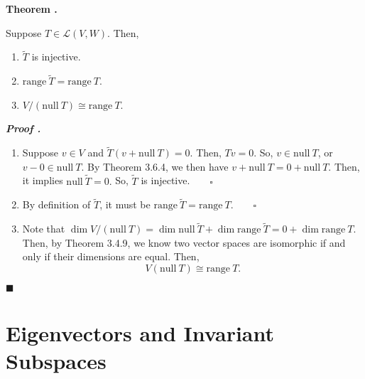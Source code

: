 \documentclass[11pt, letterpaper]{article}
\newcounter{index}[subsection]
\newenvironment*{thm}[1]{\begin{tcolorbox}\par\noindent\textbf{Theorem \thesubsection.\stepcounter{index}\theindex\ #1} \par}{\par\end{tcolorbox}}
\newcounter{nprf}[subsection]
\newenvironment*{prf}{\par\indent\textbf{\textit{Proof \stepcounter{nprf}\thenprf.}}}{\hfill$\blacksquare$\par}
\def\L{\mathcal{L}}
\def\pqde{\qquad\square}
\def\Null{\mathrm{null\ }}
\def\range{\mathrm{range\ }}
\begin{document}
\begin{thm}{}
	Suppose $T\in\L(V,W)$. Then, 
	\begin{enumerate}
		\item $\tilde{T}$ is injective.
		\item $\range\tilde{T}=\range T$.
		\item $V/(\Null T)\cong\range T$.
	\end{enumerate}	
\end{thm}
\begin{prf}
	\begin{enumerate}
		\item Suppose $v\in V$ and $\tilde{T}(v+\Null T)=0$. Then, $Tv=0$. So, $v\in\Null T$, or $v-0\in\Null T$. By Theorem 3.6.4, we then have $v+\Null T=0+\Null T$. Then, it implies $\Null\tilde{T}=0.$ So, $\tilde{T}$ is injective.$\pqde$
		\item By definition of $\tilde{T}$, it must be $\range\tilde{T}=\range T.\pqde$
		\item Note that $\dim V/(\Null T)=\dim\Null\tilde{T}+\dim\range\tilde{T}=0+\dim\range T$. Then, by Theorem 3.4.9, we know two vector spaces are isomorphic if and only if their dimensions are equal. Then, \[V(\Null T)\cong\range T.\]
	\end{enumerate}	
\end{prf}


\newpage
\section{Eigenvectors and Invariant Subspaces}
\end{document}
